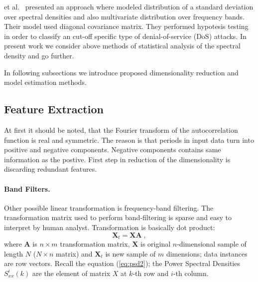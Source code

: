  et al.~\cite{chen2007tcp} presented an approach where modeled distribution
of a standard deviation over spectral densities and also multivariate distribution over
frequency bands. Their model used diagonal covariance matrix. They performed hypotesis 
testing in order to classify an cut-off specific type of denial-of-service (DoS) attacks.
In present work we consider above methods of statistical analysis of 
the spectral density and go further.

In following subsections we introduce proposed 
dimensionality reduction and model estimation methods.

\subsection{Feature Extraction}

At first it should be noted, that the Fourier transform of the autocorrelation function 
is real and symmetric. The reason is that periods in input data turn into positive and negative
components. Negative components contains same information as the postive. 
First step in reduction of the dimensionality is discarding redundant features.

\paragraph*{Band Filters.}
Other possible linear transformation is frequency-band filtering. 
The transformation matrix used to perform band-filtering is sparse and easy to 
interpret by human analyst. Transformation is basically dot product:
\begin{equation}
\mathbf{X}_t = \mathbf{X}\mathbf{A} \;,
\end{equation}
where $\mathbf{A}$ is $n\times m$ transformation matrix, $\mathbf{X}$ is original 
$n$-dimensional sample of length $N$ ($N\times n$ matrix) and $\mathbf{X}_t$ is  
new sample of $m$ dimensions; data instances are row vectors.
Recall the equation (\ref{eq:psd2}); the Power Spectral Densities $S_{xx}^i\left(k\right)$ 
are the element of matrix $X$ at $k$-th row and $i$-th column.

